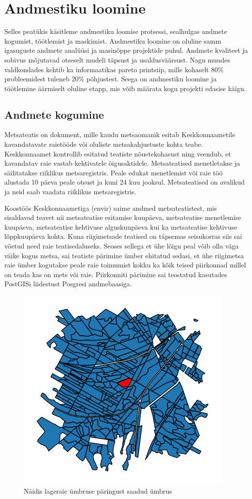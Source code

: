 \section{Andmestiku loomine}
Selles peatükis käsitleme andmestiku loomise protsessi, sealhulgas andmete kogumist, töötlemist ja maskimist. Andmestiku loomine on oluline samm igasuguste andmete analüüsi ja masinõppe projektide puhul. Andmete kvaliteet ja sobivus mõjutavad otseselt mudeli täpsust ja usaldusväärsust. Nagu muudes valdkondades kehtib ka informaatikas pareto printsiip, mille kohaselt 80\% probleemidest tuleneb 20\% põhjustest. Seega on andmestiku loomine ja töötlemine äärmiselt oluline etapp, mis võib määrata kogu projekti edasise käigu.

\subsection{Andmete kogumine}
Metsateatis on dokument, mille kaudu metsaomanik esitab Keskkonnaametile
kavandatavate raietööde või oluliste metsakahjustuste kohta teabe. Keskkonnaamet
kontrollib esitatud teatiste nõuetekohasust ning veendub, et kavandatav raie
vastab kehtivatele õigusaktidele. Metsateatised menetletakse ja säilitatakse
riiklikus metsaregistris. Peale edukat menetlemist või raie töö alustada 10 päeva peale otsust ja kuni 24 kuu jooksul. \cite{MetsateatisJaMetsaregister} Metsateatised on avalikud ja neid saab vaadata riiklikus metsaregistris.

Koostöös Keskkonnaametiga (envir) saime andmed metsateatistest, mis sisaldavad teavet nii metsateatise esitamise kuupäeva, metsateatise menetlemise kuupäeva, metsateatise kehtivuse alguskuupäeva kui ka metsateatise kehtivuse lõppkuupäeva kohta. Kuna riigimetsade teatised on täpsemas seisukorras siis sai võetud need raie teatisedaluseks. Seoses sellega et ühe lõigu peal võib olla väga väike kogus metsa, sai teatiste pärimine ümber ehitatud sedasi, et ühe riigimetsa raie ümber kogutakse peale raie toimumist kokku ka kõik teised piirkonnad millel on teada kas on mets või raie. Piirkonniti pärimine sai teostatud kasutades PostGISi liidestust Posgresi andmebaasiga.

\begin{figure}[hb]
    \centering
    \includegraphics[width=.5\textwidth]{figures/andmestik/er_id_is10124223.png}
    \caption{Näidis lageraie ümbruse päringust saadud ümbrus}
    \label{fig:umbrusexample}
\end{figure}

